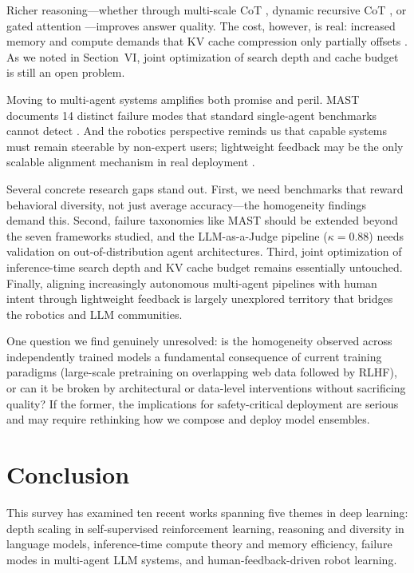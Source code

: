 \documentclass[conference]{IEEEtran}
\begin{document}
Richer reasoning---whether through multi-scale CoT \cite{song2026mscot}, dynamic recursive CoT \cite{sinha2025drcot}, or gated attention \cite{qiu2025gated}---improves answer quality. The cost, however, is real: increased memory and compute demands that KV cache compression only partially offsets \cite{staniszewski2026kv}. As we noted in Section~VI, joint optimization of search depth and cache budget is still an open problem.

Moving to multi-agent systems amplifies both promise and peril. MAST documents 14 distinct failure modes that standard single-agent benchmarks cannot detect \cite{cemri2025multiagent}. And the robotics perspective reminds us that capable systems must remain steerable by non-expert users; lightweight feedback may be the only scalable alignment mechanism in real deployment \cite{biyik2025robots}.

Several concrete research gaps stand out. First, we need benchmarks that reward behavioral diversity, not just average accuracy---the homogeneity findings demand this. Second, failure taxonomies like MAST should be extended beyond the seven frameworks studied, and the LLM-as-a-Judge pipeline ($\kappa=0.88$) needs validation on out-of-distribution agent architectures. Third, joint optimization of inference-time search depth and KV cache budget remains essentially untouched. Finally, aligning increasingly autonomous multi-agent pipelines with human intent through lightweight feedback is largely unexplored territory that bridges the robotics and LLM communities.

One question we find genuinely unresolved: is the homogeneity observed across independently trained models a fundamental consequence of current training paradigms (large-scale pretraining on overlapping web data followed by RLHF), or can it be broken by architectural or data-level interventions without sacrificing quality? If the former, the implications for safety-critical deployment are serious and may require rethinking how we compose and deploy model ensembles.

\section{Conclusion}
This survey has examined ten recent works spanning five themes in deep learning: depth scaling in self-supervised reinforcement learning, reasoning and diversity in language models, inference-time compute theory and memory efficiency, failure modes in multi-agent LLM systems, and human-feedback-driven robot learning.
\end{document}
